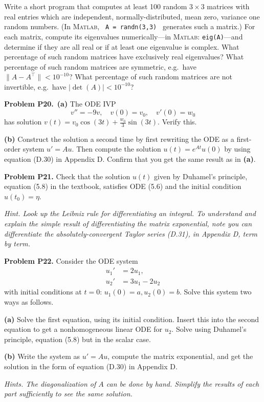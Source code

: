 \documentclass[12pt]{amsart}
\newcommand{\Matlab}{\textsc{Matlab}\xspace}
\newcommand{\prob}[1]{\bigskip\noindent\textbf{#1}\quad }
\newcommand{\epart}[1]{\medskip\noindent\textbf{(#1)}\quad }
\newcommand{\ppart}[1]{\,\textbf{(#1)}\quad }
\begin{document}
\medskip \noindent
Write a short program that computes at least 100 random $3\times 3$ matrices with real entries which are independent, normally-distributed, mean zero, variance one random numbers.  (In \Matlab, \verb| A = randn(3,3) | generates such a matrix.)  For each matrix, compute its eigenvalues numerically---in \Matlab: \verb|eig(A)|---and determine if they are all real or if at least one eigenvalue is complex.  What percentage of such random matrices have exclusively real eigenvalues?  What percentage of such random matrices are symmetric, e.g.~have $\|A-A^\top\|<10^{-10}$?  What percentage of such random matrices are not invertible, e.g.~have $|\det(A)|<10^{-10}$?


\prob{Problem P20.}  \ppart{a} The ODE IVP
    $$v'' = - 9 v, \quad v(0) = v_0, \quad v'(0) = w_0$$
has solution $v(t) = v_0 \cos(3 t) + \frac{w_0}{3} \sin(3t)$.  Verify this.

\epart{b}  Construct the solution a second time by first rewriting the ODE as a first-order system $u' = A u$.  Then compute the solution $u(t) = e^{At} u(0)$ by using equation (D.30) in Appendix D.  Confirm that you get the same result as in \textbf{(a)}.


\prob{Problem P21.}  Check that the solution $u(t)$ given by Duhamel's principle, equation (5.8) in the textbook, satisfies ODE (5.6) and the initial condition $u(t_0)=\eta$.

\medskip
\noindent \emph{Hint.  Look up the Leibniz rule for differentiating an integral.  To understand and explain the simple result of differentiating the matrix exponential, note you can differentiate the absolutely-convergent Taylor series (D.31), in Appendix D, term by term.}


\prob{Problem P22.}  Consider the ODE system
\begin{align*}
u_1' &= 2 u_1, \\
u_2' &= 3 u_1 - 2 u_2
\end{align*}
with initial conditions at $t=0$: $u_1(0) = a, u_2(0) = b$.  Solve this system two ways as follows.

\epart{a} Solve the first equation, using its initial condition.  Insert this into the second equation to get a nonhomogeneous linear ODE for $u_2$.  Solve using Duhamel's principle, equation (5.8) but in the scalar case.

\epart{b} Write the system as $u'=Au$, compute the matrix exponential, and get the solution in the form of equation (D.30) in Appendix D.

\medskip
\noindent \emph{Hints. The diagonalization of $A$ can be done by hand.  Simplify the results of each part sufficiently to see the same solution.}
\end{document}
